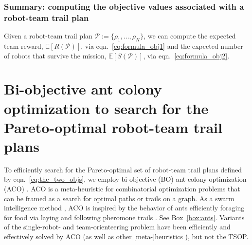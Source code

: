 \documentclass[fleqn,10pt,lineno]{wlpeerj}
\begin{document}
\subsubsection{Summary: computing the objective values associated with a robot-team trail plan}
Given a robot-team trail plan $\mathcal{P}:=\{\rho_1,...,\rho_K\}$, we can compute the expected team reward, $\mathbb{E}[R(\mathcal{P})]$, via eqn.~\ref{eq:formula_obj1} and the expected number of robots that survive the mission, $\mathbb{E}[S(\mathcal{P})]$, via eqn.~\ref{eq:formula_obj2}.



\section{Bi-objective ant colony optimization to search for the Pareto-optimal robot-team trail plans}
To efficiently search for the Pareto-optimal set of robot-team trail plans defined by eqn.~\ref{eq:the_two_objs}, we employ bi-objective (BO) ant colony optimization (ACO) \cite{iredi2001bi}. ACO \cite{dorigo2006ant,bonabeau1999swarm,blum2005ant,simon2013evolutionary} is a meta-heuristic for combinatorial optimization problems that can be framed as a search for optimal paths or trails on a graph. As a swarm intelligence method \cite{bonabeau1999swarm}, 
ACO is inspired by the behavior of ants efficiently foraging for food via laying and following pheromone trails \cite{bonabeau2000inspiration}. See Box~\ref{box:ants}. 
Variants of the single-robot- and team-orienteering problem have been efficiently and effectively solved by ACO \cite{ke2008ants,chen2015multiobjective,verbeeck2017time,sohrabi2021acs,chen2022environment,montemanni2011enhanced} (as well as other [meta-]heuristics \cite{gavalas2014survey,dang2013effective,chao1996fast,butt1994heuristic}), but not the TSOP.
\end{document}
